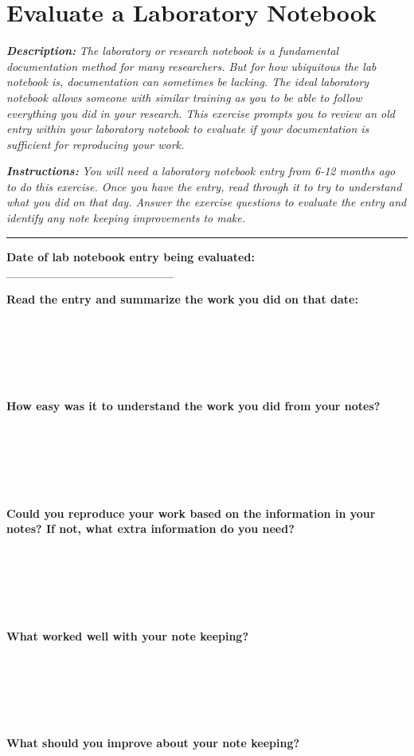 \documentclass[
]{book}
\begin{document}
\hypertarget{lab-notebook}{%
\section{Evaluate a Laboratory Notebook}\label{lab-notebook}}

\textbf{\emph{Description:}} \emph{The laboratory or research notebook is a fundamental documentation method for many researchers. But for how ubiquitous the lab notebook is, documentation can sometimes be lacking. The ideal laboratory notebook allows someone with similar training as you to be able to follow everything you did in your research. This exercise prompts you to review an old entry within your laboratory notebook to evaluate if your documentation is sufficient for reproducing your work.}

\textbf{\emph{Instructions:}} \emph{You will need a laboratory notebook entry from 6-12 months ago to do this exercise. Once you have the entry, read through it to try to understand what you did on that day. Answer the exercise questions to evaluate the entry and identify any note keeping improvements to make.}

\begin{center}\rule{0.5\linewidth}{0.5pt}\end{center}

\textbf{Date of lab notebook entry being evaluated:} \_\_\_\_\_\_\_\_\_\_\_\_\_\_\_\_\_\_\_\_

\textbf{Read the entry and summarize the work you did on that date:}

~

~

~

\textbf{How easy was it to understand the work you did from your notes?}

~

~

~

\textbf{Could you reproduce your work based on the information in your notes? If not, what extra information do you need?}

~

~

~

\textbf{What worked well with your note keeping?}

~

~

~

\textbf{What should you improve about your note keeping?}

~
\end{document}
